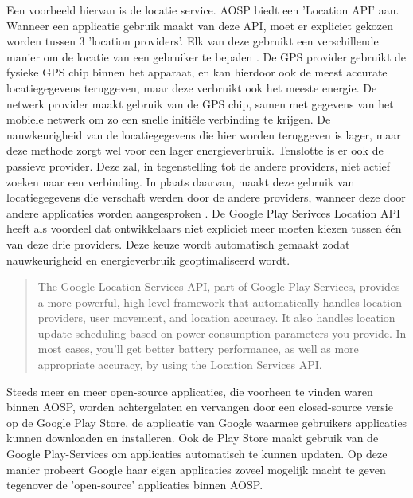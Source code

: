 Een voorbeeld hiervan is de locatie service. AOSP biedt een 'Location API' aan. Wanneer een applicatie gebruik maakt van deze API, moet er expliciet gekozen worden tussen 3 'location providers'. Elk van deze gebruikt een verschillende manier om de locatie van een gebruiker te bepalen \autocite{android_location-strategies}. De GPS provider gebruikt de fysieke GPS chip binnen het apparaat, en kan hierdoor ook de meest accurate locatiegegevens teruggeven, maar deze verbruikt ook het meeste energie. De netwerk provider maakt gebruik van de GPS chip, samen met gegevens van het mobiele netwerk om zo een snelle initiële verbinding te krijgen. De nauwkeurigheid van de locatiegegevens die hier worden teruggeven is lager, maar deze methode zorgt wel voor een lager energieverbruik. Tenslotte is er ook de passieve provider. Deze zal, in tegenstelling tot de andere providers, niet actief zoeken naar een verbinding. In plaats daarvan, maakt deze gebruik van locatiegegevens die verschaft werden door de andere providers, wanneer deze door andere applicaties worden aangesproken \autocite{idris_location-providers}. De Google Play Serivces Location API heeft als voordeel dat ontwikkelaars niet expliciet meer moeten kiezen tussen één van deze drie providers. Deze keuze wordt automatisch gemaakt zodat nauwkeurigheid en energieverbruik geoptimaliseerd wordt. \autocite{android_location-strategies}

\blockcquote{android_location-strategies}{
    The Google Location Services API, part of Google Play Services, provides a more powerful, high-level framework that automatically handles location providers, user movement, and location accuracy. It also handles location update scheduling based on power consumption parameters you provide. In most cases, you'll get better battery performance, as well as more appropriate accuracy, by using the Location Services API.
}

Steeds meer en meer open-source applicaties, die voorheen te vinden waren binnen AOSP, worden achtergelaten en vervangen door een closed-source versie op de Google Play Store, de applicatie van Google waarmee gebruikers applicaties kunnen downloaden en installeren. Ook de Play Store maakt gebruik van de Google Play-Services om applicaties automatisch te kunnen updaten. Op deze manier probeert Google haar eigen applicaties zoveel mogelijk macht te geven tegenover de 'open-source' applicaties binnen AOSP. \autocite{amadeo_open-source}

